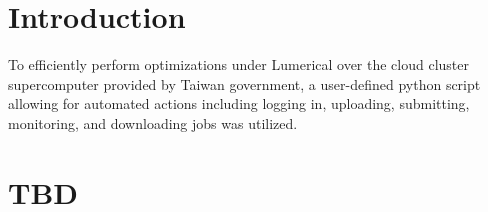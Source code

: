 
\section{Introduction}
    To efficiently perform optimizations under Lumerical over the cloud cluster supercomputer provided by Taiwan government, 
    a user-defined python script allowing for automated actions including 
    logging in, uploading, submitting, monitoring, and downloading jobs was utilized. 
\section{TBD}
    